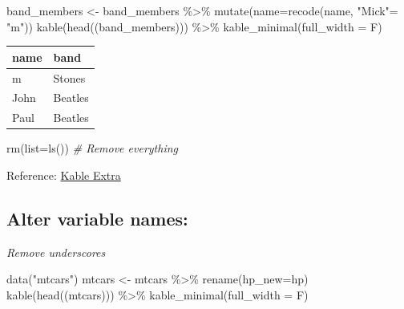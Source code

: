 \documentclass[
]{article}
\newenvironment{Shaded}{\begin{snugshade}}{\end{snugshade}}
\newcommand{\AttributeTok}[1]{\textcolor[rgb]{0.77,0.63,0.00}{#1}}
\newcommand{\CommentTok}[1]{\textcolor[rgb]{0.56,0.35,0.01}{\textit{#1}}}
\newcommand{\FunctionTok}[1]{\textcolor[rgb]{0.00,0.00,0.00}{#1}}
\newcommand{\NormalTok}[1]{#1}
\newcommand{\OtherTok}[1]{\textcolor[rgb]{0.56,0.35,0.01}{#1}}
\newcommand{\SpecialCharTok}[1]{\textcolor[rgb]{0.00,0.00,0.00}{#1}}
\newcommand{\StringTok}[1]{\textcolor[rgb]{0.31,0.60,0.02}{#1}}
\begin{document}
\begin{Shaded}
\begin{Highlighting}[]
\NormalTok{band\_members }\OtherTok{\textless{}{-}}\NormalTok{ band\_members }\SpecialCharTok{\%\textgreater{}\%} \FunctionTok{mutate}\NormalTok{(}\AttributeTok{name=}\FunctionTok{recode}\NormalTok{(name, }\StringTok{"Mick"}\OtherTok{=} \StringTok{"m"}\NormalTok{))}
\FunctionTok{kable}\NormalTok{(}\FunctionTok{head}\NormalTok{((band\_members))) }\SpecialCharTok{\%\textgreater{}\%} \FunctionTok{kable\_minimal}\NormalTok{(}\AttributeTok{full\_width =}\NormalTok{ F)}
\end{Highlighting}
\end{Shaded}

\begin{table}
\centering
\begin{tabular}{l|l}
\hline
name & band\\
\hline
m & Stones\\
\hline
John & Beatles\\
\hline
Paul & Beatles\\
\hline
\end{tabular}
\end{table}

\begin{Shaded}
\begin{Highlighting}[]
\FunctionTok{rm}\NormalTok{(}\AttributeTok{list=}\FunctionTok{ls}\NormalTok{()) }\CommentTok{\# Remove everything}
\end{Highlighting}
\end{Shaded}

Reference: \href{https://cran.r-project.org/web/packages/kableExtra/vignettes/awesome_table_in_html.html}{Kable Extra}

\hypertarget{alter-variable-names}{%
\subsection{Alter variable names:}\label{alter-variable-names}}

\emph{Remove underscores}

\begin{Shaded}
\begin{Highlighting}[]
\FunctionTok{data}\NormalTok{(}\StringTok{"mtcars"}\NormalTok{)}
\NormalTok{mtcars }\OtherTok{\textless{}{-}}\NormalTok{ mtcars }\SpecialCharTok{\%\textgreater{}\%} \FunctionTok{rename}\NormalTok{(}\AttributeTok{hp\_new=}\NormalTok{hp)}
\FunctionTok{kable}\NormalTok{(}\FunctionTok{head}\NormalTok{((mtcars))) }\SpecialCharTok{\%\textgreater{}\%} \FunctionTok{kable\_minimal}\NormalTok{(}\AttributeTok{full\_width =}\NormalTok{ F)}
\end{Highlighting}
\end{Shaded}
\end{document}
